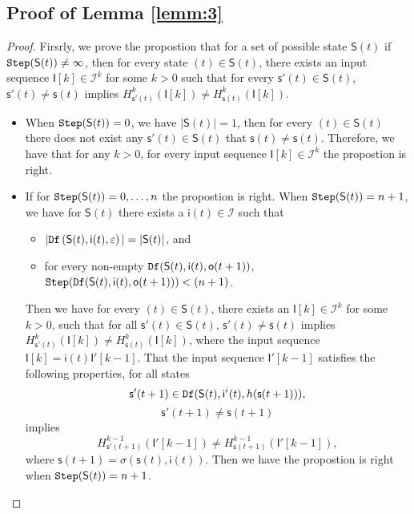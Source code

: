 \begin{appendices}
\subsection{Proof of Lemma \ref{lemm:3}}
\begin{proof} Firsrly, we prove the propostion that for a set of possible state $\mathsf{S}(t)$ if ${\tt Step}(\mathsf{S}(t))\ne\infty$, then for every state \State$(t)\in \mathsf{S}(t)$, there exists an input sequence $\mathsf{I}[k]\in\mathcal{I}^{k}$ for some $k >0$ such that for every $\mathsf{s}'(t)\in \mathsf{S}(t)$, $\mathsf{s}'(t)\neq \mathsf{s}(t)$ implies $H^{k}_{\mathsf{s}'(t)}(\mathsf{I}[k])\neq H^{k}_{{\mathsf{s}(t)}}(\mathsf{I}[k])$.
\begin{itemize}
\item When ${\tt Step}(\mathsf{S}(t))=0$, we have $|\mathsf{S}(t)|=1$, then for every \State$(t)$$\in \mathsf{S}(t)$ there does not exist any $\mathsf{s}'(t)\in \mathsf{S}(t)$ that $\mathsf{s}(t)\neq \mathsf{s}(t)$. Therefore, we have that for any $k >0$, for every input sequence $\mathsf{I}[k]\in\mathcal{I}^{k}$ the propostion is right. 
\item If for ${\tt Step}(\mathsf{S}(t))=0,\ldots, n$ the propostion is right. When ${\tt Step}(\mathsf{S}(t))=n+1$, we have for $\mathsf{S}(t)$ there exists a $\mathsf{i}(t)\in \mathcal{I}$ such that
 \begin{itemize}
 \item  $|{\tt Df}\left(\mathsf{S}(t),\mathsf{i}(t),\varepsilon\right)|=|\mathsf{S}(t)|$, and 
 \item  for every non-empty ${\tt Df}(\mathsf{S}(t),\mathsf{i}(t),\mathsf{o}(t+1))$, ${\tt Step}({\tt Df}(\mathsf{S}(t),\mathsf{i}(t),\mathsf{o}(t+1)))<(n+1)$.
 \end{itemize}
 Then we have for every \State$(t)$$\in \mathsf{S}(t)$, there exists an $\mathsf{I}[k]\in\mathcal{I}^{k}$ for some $k >0$, such that for all $\mathsf{s}'(t)\in \mathsf{S}(t)$, $\mathsf{s}'(t)\neq \mathsf{s}(t)$ implies $H^{k}_{\mathsf{s}'(t)}(\mathsf{I}[k])\neq H^{k}_{{\mathsf{s}(t)}}(\mathsf{I}[k])$, where the input sequence $\mathsf{I}[k]=\mathsf{i}(t)\mathsf{I}'[k-1]$. That the input sequence $\mathsf{I}'[k-1]$ satisfies the following properties,
  for all states \[\mathsf{s}'(t+1)\in {\tt Df}(\mathsf{S}(t),\mathsf{i}^{i}(t),h(\mathsf{s}(t+1))),\]\[\mathsf{s}'(t+1)\neq \mathsf{s}(t+1)\] implies \[H^{k-1}_{\mathsf{s}'(t+1)}(\mathsf{I}'[k-1])\neq H^{k-1}_{{\mathsf{s}(t+1)}}(\mathsf{I}'[k-1]),\] where $\mathsf{s}(t+1)=\sigma(\mathsf{s}(t),\mathsf{i}(t))$. Then we have the propostion is right when ${\tt Step}(\mathsf{S}(t))=n+1$. 


\end{itemize}
\end{proof}
\end{appendices}
